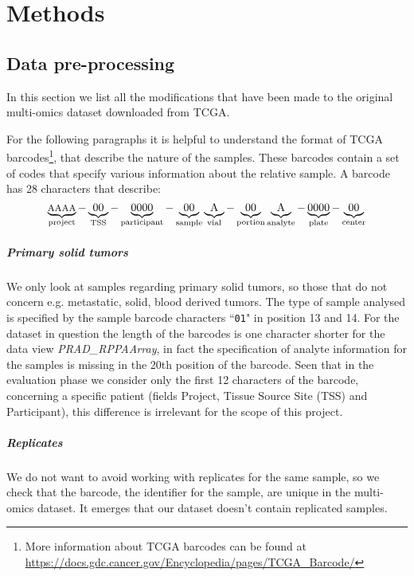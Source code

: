 \chapter{Methods}
\section{Data pre-processing}\label{methods_preProcessing}
In this section we list all the modifications that have been made to the original multi-omics dataset downloaded from TCGA.\newline

For the following paragraphs it is helpful to understand the format of TCGA barcodes\footnote{More information about TCGA barcodes can be found at \url{https://docs.gdc.cancer.gov/Encyclopedia/pages/TCGA_Barcode/}}, that describe the nature of the samples. These barcodes contain a set of codes that specify various information about the relative sample. A barcode has 28 characters that describe:
\begin{equation*}
    \underbrace{\text{\footnotesize AAAA}}_\text{project}-
    \underbrace{\text{00}}_\text{TSS}-
    \underbrace{\text{0000}}_\text{participant}-
    \underbrace{\text{00}}_\text{sample}
    \underbrace{\text{A}}_\text{vial}-
    \underbrace{\text{00}}_\text{portion}
    \underbrace{\text{A}}_\text{analyte}-
    \underbrace{\text{0000}}_\text{plate}-
    \underbrace{\text{00}}_\text{center}
\end{equation*}
\paragraph{Primary solid tumors}
We only look at samples regarding primary solid tumors, so those that do not concern e.g. metastatic, solid, blood derived tumors. The type of sample analysed is specified by the sample barcode characters ``\texttt{01}" in position 13 and 14.
For the dataset in question the length of the barcodes is one character shorter for the data view \textit{PRAD\_RPPAArray}, in fact the specification of analyte information for the samples is missing in the 20th position of the barcode. Seen that in the evaluation phase we consider only the first 12 characters of the barcode, concerning a specific patient (fields Project, Tissue Source Site (TSS) and Participant), this difference is irrelevant for the scope of this project.
\paragraph{Replicates} We do not want to avoid working with replicates for the same sample, so we check that the barcode, the identifier for the sample, are unique in the multi-omics dataset. It emerges that our dataset doesn't contain replicated samples.
